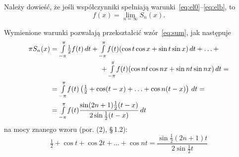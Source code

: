 \documentclass[leqno]{book}
\newcommand{\parsign}[0]{\S\,}
\begin{document}
    Należy dowieść, że jeśli współczynniki spełniają warunki~\eqref{eq:el0}--\eqref{eq:elb}, to
%
    \begin{equation}
        \label{eq:fS}
        f(x) = \lim_{n = \infty} S_n(x) \text{.}
    \end{equation}

    Wymienione warunki pozwalają przekształcić wzór~\eqref{eq:sum}, jak następuje
%
    \begin{gather}
        \begin{align}
            \pi S_n(x) & = \mathsmaller{\int\limits_{-\pi}^{\pi}} \tfrac{1}{2} f(t) \,dt + \mathsmaller{\int\limits_{-\pi}^{\pi}} f(t)(\cos t \cos x + \sin t \sin x) \,dt +
            \ldots + \\
            & \kern 6pc + \mathsmaller{\int\limits_{-\pi}^{\pi}} f(t)(\cos nt \cos nx + \sin nt \sin nx) \,dt = \notag\\
            & = \mathsmaller{\int\limits_{-\pi}^{\pi}} f(t)\left(\tfrac{1}{2} + \cos (t -x) + \ldots + \cos n(t - x)\right) \,dt = \notag\\
            & = \mathsmaller{\int\limits_{-\pi}^{\pi}} f(t) \frac{\sin (2n + 1) \frac{1}{2} (t - x)}{2 \sin \frac{1}{2} (t - x)} \,dt \notag
        \end{align}
        \raisetag{3\baselineskip}
    \end{gather}
%
    na mocy znanego wzoru (por. (2), \parsign 1.2):
%
    \[
        \tfrac{1}{2} + \cos t + \cos 2t + \ldots + \cos nt = \frac{\sin \frac{1}{2} (2n + 1) t}{2 \sin \frac{1}{2} t}
    \]
\end{document}
